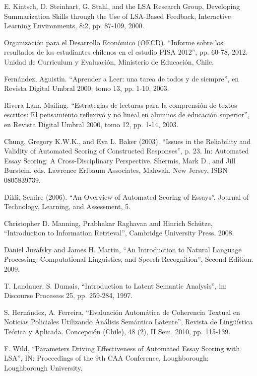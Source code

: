 \documentclass[12pt]{diicc}
\begin{document}
\begin{thebibliography} {}
	E. Kintsch, D. Steinhart, G. Stahl, and the LSA Research Group, Developing Summarization Skills through the Use of LSA-Based Feedback, Interactive Learning Environments, 8:2, pp. 87-109, 2000.
	
	 Organización para el Desarrollo Económico (OECD). ``Informe sobre los resultados de los estudiantes chilenos en el estudio PISA 2012'', pp. 60-78, 2012. Unidad de Curriculum y Evaluación, Ministerio de Educación, Chile.

	 Fernández, Aguistín. ``Aprender a Leer: una tarea de todos y de siempre'', en Revista Digital
Umbral 2000, tomo 13, pp. 1-10, 2003.

	 Rivera Lam, Mailing. ``Estrategias de lecturas para la comprensión de textos escritos: El pensamiento reflexivo y no lineal en alumnos de educación superior'', en Revista Digital Umbral 2000, tomo 12, pp. 1-14, 2003.
	
	 Chung, Gregory K.W.K., and Eva L. Baker (2003). ``Issues in the Reliability and Validity of Automated Scoring of Constructed Responses'', p. 23. In: Automated Essay Scoring: A Cross-Disciplinary Perspective. Shermis, Mark D., and Jill Burstein, eds. Lawrence Erlbaum Associates, Mahwah, New Jersey, ISBN 0805839739.
	
	 Dikli, Semire (2006). ``An Overview of Automated Scoring of Essays''. Journal of Technology, Learning, and Assessment, 5.
	
	 Christopher D. Manning, Prabhakar Raghavan and Hinrich Schütze, ``Introduction to Information Retrieval'', Cambridge University Press. 2008.
	
	 Daniel Jurafsky and James H. Martin, ``An Introduction to Natural Language Processing, 
Computational Linguistics, and Speech Recognition'', Second Edition. 2009.

	 T. Landauer, S. Dumais, ``Introduction to Latent Semantic Analysis'', in: Discourse Procesess 25, pp. 259-284, 1997.
	
	 S. Hernández, A. Ferreira, ``Evaluación Automática de Coherencia Textual en Noticias Policiales Utilizando Análisis Semántico Latente'', Revista de Lingüística Teórica y Aplicada. Concepción (Chile), 48 (2), II Sem. 2010, pp. 115-139.
	
	 F. Wild, ``Parameters Driving Effectiveness of Automated Essay Scoring with LSA'', IN: Proceedings of the 9th CAA Conference, Loughborough: Loughborough University.
	

\end{thebibliography}
\end{document}
